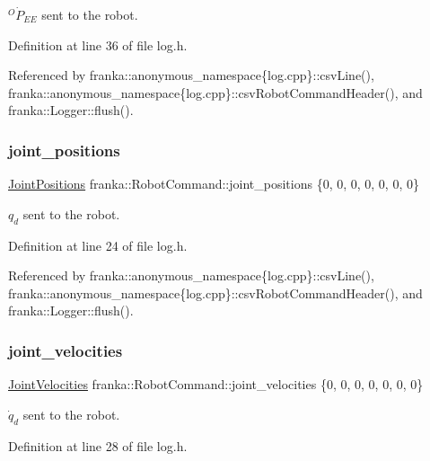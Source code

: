 $^O\dot{P}_{EE}$ sent to the robot. 

Definition at line 36 of file log.\+h.



Referenced by franka\+::anonymous\+\_\+namespace\{log.\+cpp\}\+::csv\+Line(), franka\+::anonymous\+\_\+namespace\{log.\+cpp\}\+::csv\+Robot\+Command\+Header(), and franka\+::\+Logger\+::flush().

\mbox{\label{structfranka_1_1RobotCommand_a086afcec596eae5284b6c39dc1452280}} 
\subsubsection{\texorpdfstring{joint\+\_\+positions}{joint\_positions}}
{\footnotesize\ttfamily \hyperlink{classfranka_1_1JointPositions}{Joint\+Positions} franka\+::\+Robot\+Command\+::joint\+\_\+positions \{0, 0, 0, 0, 0, 0, 0\}}

$q_d$ sent to the robot. 

Definition at line 24 of file log.\+h.



Referenced by franka\+::anonymous\+\_\+namespace\{log.\+cpp\}\+::csv\+Line(), franka\+::anonymous\+\_\+namespace\{log.\+cpp\}\+::csv\+Robot\+Command\+Header(), and franka\+::\+Logger\+::flush().

\mbox{\label{structfranka_1_1RobotCommand_a049657cf2bbbb53d6ffa5581721e7b71}} 
\subsubsection{\texorpdfstring{joint\+\_\+velocities}{joint\_velocities}}
{\footnotesize\ttfamily \hyperlink{classfranka_1_1JointVelocities}{Joint\+Velocities} franka\+::\+Robot\+Command\+::joint\+\_\+velocities \{0, 0, 0, 0, 0, 0, 0\}}

$\dot{q}_d$ sent to the robot. 

Definition at line 28 of file log.\+h.



